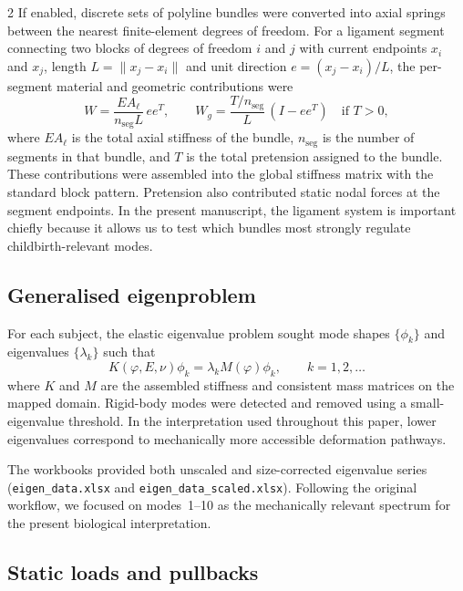 \documentclass[openacc]{rsproca_new}
\begin{document}
\begin{multicols}{2}
If enabled, discrete sets of polyline bundles were converted into axial springs between the nearest finite-element degrees of freedom. For a ligament segment connecting two blocks of degrees of freedom $i$ and $j$ with current endpoints $x_i$ and $x_j$, length $L=\|x_j-x_i\|$ and unit direction $e=(x_j-x_i)/L$, the per-segment material and geometric contributions were
\begin{equation}
W=\frac{EA_{\ell}}{n_{\mathrm{seg}}L}\,ee^{T}, \qquad
W_{g}=\frac{T/n_{\mathrm{seg}}}{L}\,(I-ee^{T}) \quad \text{if } T>0,
\end{equation}
where $EA_{\ell}$ is the total axial stiffness of the bundle, $n_{\mathrm{seg}}$ is the number of segments in that bundle, and $T$ is the total pretension assigned to the bundle. These contributions were assembled into the global stiffness matrix with the standard block pattern. Pretension also contributed static nodal forces at the segment endpoints. In the present manuscript, the ligament system is important chiefly because it allows us to test which bundles most strongly regulate childbirth-relevant modes.

\subsection{Generalised eigenproblem}

For each subject, the elastic eigenvalue problem sought mode shapes $\{\phi_{k}\}$ and eigenvalues $\{\lambda_{k}\}$ such that
\begin{equation}
K(\varphi,E,\nu)\phi_{k} = \lambda_{k} M(\varphi)\phi_{k}, \qquad k=1,2,\ldots
\end{equation}
where $K$ and $M$ are the assembled stiffness and consistent mass matrices on the mapped domain. Rigid-body modes were detected and removed using a small-eigenvalue threshold. In the interpretation used throughout this paper, lower eigenvalues correspond to mechanically more accessible deformation pathways.

The workbooks provided both unscaled and size-corrected eigenvalue series (\texttt{eigen\_data.xlsx} and \texttt{eigen\_data\_scaled.xlsx}). Following the original workflow, we focused on modes~1--10 as the mechanically relevant spectrum for the present biological interpretation.

\subsection{Static loads and pullbacks}


\end{multicols}
\end{document}
